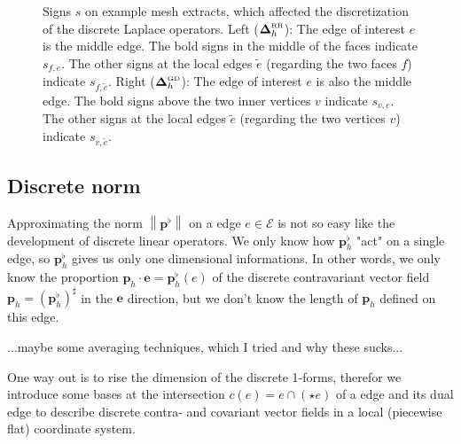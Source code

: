 \documentclass[a4paper,11pt]{scrartcl}
\newcommand{\pfl}{\mathbf{p}^{\flat}}
\newcommand{\pflh}{\mathbf{p}^{\flat}_{h}}
\newcommand{\ph}{\mathbf{p}_{h}}
\newcommand{\LB}{\boldsymbol{\Delta}^{\text{\tiny RR}}}
\newcommand{\LCB}{\boldsymbol{\Delta}^{\text{\tiny GD}}}
\newcommand{\LBh}{\LB_{h}}
\newcommand{\LCBh}{\LCB_{h}}
\newcommand{\E}{\mathcal{E}}
\newcommand{\e}{\mathbf{e}}
\begin{document}
\begin{figure}
\begin{minipage}[htp]{.7\textwidth}
      \end{minipage}
      \caption{Signs \( s \) on example mesh extracts, which affected the discretization of the discrete Laplace operators.
               Left (\( \LBh \)): The edge of interest \( e \) is the middle edge.
                                  The bold signs in the middle of the faces indicate \( s_{f,e} \).
                                  The other signs at the local edges \( \tilde{e} \) (regarding the two faces \( f \)) indicate \( s_{f,\tilde{e}} \).
               Right (\( \LCBh \)): The edge of interest \( e \) is also the middle edge.
                                    The bold signs above the two inner vertices \( v \) indicate \( s_{v,e} \).
                                    The other signs at the local edges \( \tilde{e} \) (regarding the two vertices \( v \))
                                    indicate \( s_{v,\tilde{e}} \).}
       \label{figSigns}
    \end{figure}

  \subsection{Discrete norm}
    
    Approximating the norm \( \left\| \pfl \right\| \) on a edge \( e\in\E \) is not so easy like the development of discrete linear
    operators. 
    We only know how \( \pflh \) "act" on a single edge, so \( \pflh \) gives us only one dimensional informations.
    In other words, we only know the proportion \( \ph \cdot \e = \pflh (e)\) of the discrete contravariant vector field 
    \( \ph = \left( \pflh \right)^{\sharp} \) in the
    \( \e \) direction, but we don't know the length of \( \ph \) defined on this edge.

    ...maybe some averaging techniques, which I tried and why these sucks...
   
    One way out is to rise the dimension of the discrete 1-forms, therefor we introduce some bases at the intersection 
    \( c(e) = e\cap (\star e) \) of a edge and its dual edge to describe discrete contra- and covariant vector fields in a local 
    (piecewise flat)
    coordinate system.
\end{document}
